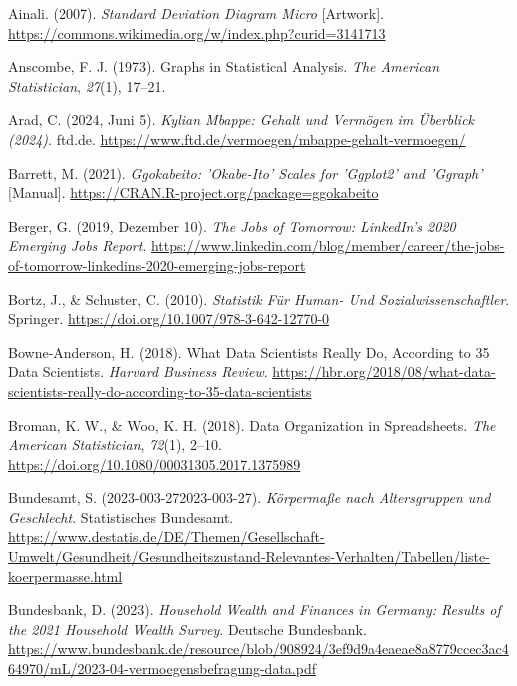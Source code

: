 \documentclass[
  letterpaper,
  twoside,
  open=any]{scrbook}
\newlength{\cslhangindent}
\newenvironment{CSLReferences}[2] %
 {\begin{list}{}{%
  \setlength{\itemindent}{0pt}
  \setlength{\leftmargin}{0pt}
  \setlength{\parsep}{0pt}
  \ifodd #1
   \setlength{\leftmargin}{\cslhangindent}
   \setlength{\itemindent}{-1\cslhangindent}
  \fi
  \setlength{\itemsep}{#2\baselineskip}}}
 {\end{list}}
\theoremstyle{definition}
\theoremstyle{definition}
\theoremstyle{definition}
\theoremstyle{remark}
\begin{document}
\label{refs}
\begin{CSLReferences}{1}{0}
Ainali. (2007). \emph{Standard Deviation Diagram Micro} {[}Artwork{]}.
\url{https://commons.wikimedia.org/w/index.php?curid=3141713}

Anscombe, F. J. (1973). Graphs in Statistical Analysis. \emph{The
American Statistician}, \emph{27}(1), 17--21.

Arad, C. (2024, Juni 5). \emph{Kylian Mbappe: Gehalt und Vermögen im
Überblick (2024)}. ftd.de.
\url{https://www.ftd.de/vermoegen/mbappe-gehalt-vermoegen/}

Barrett, M. (2021). \emph{Ggokabeito: '{Okabe-Ito}' {Scales} for
'Ggplot2' and 'Ggraph'} {[}Manual{]}.
\url{https://CRAN.R-project.org/package=ggokabeito}

Berger, G. (2019, Dezember 10). \emph{The {Jobs} of {Tomorrow}:
{LinkedIn}'s 2020 {Emerging Jobs Report}}.
\url{https://www.linkedin.com/blog/member/career/the-jobs-of-tomorrow-linkedins-2020-emerging-jobs-report}

Bortz, J., \& Schuster, C. (2010). \emph{Statistik Für {Human-} Und
{Sozialwissenschaftler}}. Springer.
\url{https://doi.org/10.1007/978-3-642-12770-0}

Bowne-Anderson, H. (2018). What {Data Scientists Really Do}, {According}
to 35 {Data Scientists}. \emph{Harvard Business Review}.
\url{https://hbr.org/2018/08/what-data-scientists-really-do-according-to-35-data-scientists}

Broman, K. W., \& Woo, K. H. (2018). Data {Organization} in
{Spreadsheets}. \emph{The American Statistician}, \emph{72}(1), 2--10.
\url{https://doi.org/10.1080/00031305.2017.1375989}

Bundesamt, S. (2023-003-272023-003-27). \emph{Körpermaße nach
Altersgruppen und Geschlecht}. Statistisches Bundesamt.
\url{https://www.destatis.de/DE/Themen/Gesellschaft-Umwelt/Gesundheit/Gesundheitszustand-Relevantes-Verhalten/Tabellen/liste-koerpermasse.html}

Bundesbank, D. (2023). \emph{Household Wealth and Finances in {Germany}:
{Results} of the 2021 Household Wealth Survey}. Deutsche Bundesbank.
\url{https://www.bundesbank.de/resource/blob/908924/3ef9d9a4eaeae8a8779ccec3ac464970/mL/2023-04-vermoegensbefragung-data.pdf}


\end{CSLReferences}
\end{document}
